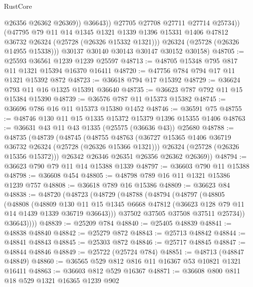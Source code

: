 \begin{lexlean}{RustCore}
\begin{coremodule}
                    @26356
                    @26362
                    @26369))
                @36643))
            @27705
            @27708
            @27711
            @27714
            @25734))
        (@47795
          @79
          @11
          @14
          @1345
          @1321
          @1339
          @1396
          @15331
          @1406
          @47812
          @36732
          @26324
          (@25728 (@26326 @15332 @1321)))
        @26324
        (@25728 (@26326 @14955 @15338)))
      @30137
      @30140
      @30143
      @30147
      @30152
      @30158)
@48705 := @25593 @36561 @1239 @1239 @25597
@48713 := @48705 @15348 @795 @817 @11 @1321 @15394 @16370 @16411
@48720 := @47756 @784 @794 @17 @11 @1321 @15392 @872
@48723 := @36618 @794 @17 @15392
@48729 := @36624 @793 @11 @16 @1325 @15391 @36640
@48735 := @36623 @787 @792 @11 @15 @15384 @15390
@48739 := @36576 @787 @11 @15373 @15382
@48745 := @36696 @786 @16 @11 @15373 @15380 @1452
@48746 := @36591 @75
@48755 := @48746 @130 @11 @15 @1335 @15372 @15379 @1396 @15355 @1406
@48763 := @36631 @43 @11 @43 @1335 (@25575 (@36636 @43)) @25680
@48788 := @48735
    (@48739
      (@48745
        (@48755
          @48763
          (@36727 @15365 @1406 @36719 @36732 @26324 (@25728 (@26326 @15366 @1321)))
          @26324
          (@25728 (@26326 @15356 @15372)))
        @26342
        @26346
        @26351
        @26356
        @26362
        @26369))
@48794 := @36623 @790 @79 @11 @14 @15388 @1339
@48797 := @36603 @790 @11 @15388
@48798 := @36608 @454
@48805 := @48798 @789 @16 @11 @1321 @15386 @1239 @757
@48808 := @36618 @789 @16 @15386
@48809 := @36623 @84
@48838 := @48720
    (@48723
      (@48729
        (@48788
          (@48794
            (@48797
              (@48805
                (@48808
                  (@48809
                    @130
                    @11
                    @15
                    @1345
                    @6668
                    @47812
                    (@36623 @128 @79 @11 @14 @1439 @1339 @36719 @36643)))
                @37502
                @37505
                @37508
                @37511
                @25734))
            @36643))))
@48839 := @25209 @784
@48840 := @25405 @48839
@48841 := @48838 @48840
@48842 := @25279 @872
@48843 := @25713 @48842
@48844 := @48841 @48843
@48845 := @25303 @872
@48846 := @25717 @48845
@48847 := @48844 @48846
@48849 := @25722 (@25724 @784)
@48851 := @48713 (@48847 @48849)
@48860 := @36565 @529 @812 @816 @11 @16367 @53 @10821 @1321 @16411
@48863 := @36603 @812 @529 @16367
@48871 := @36608 @800 @811 @18 @529 @1321 @16365 @1239 @902

\end{coremodule}
\end{lexlean}
